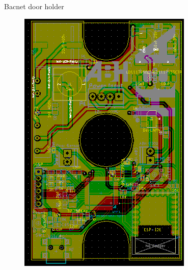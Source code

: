 \documentclass[aspectratio=169]{beamer}
\begin{document}
\begin{frame}{Bacnet door holder}
\begin{figure}[H]
\begin{columns}[T]
\begin{column}{.2\linewidth}
        \includegraphics[width=\linewidth]{images/BacnetDoorHolder2}
      \end{column}
    \end{columns}
  \end{figure}
\end{frame}
\end{document}
